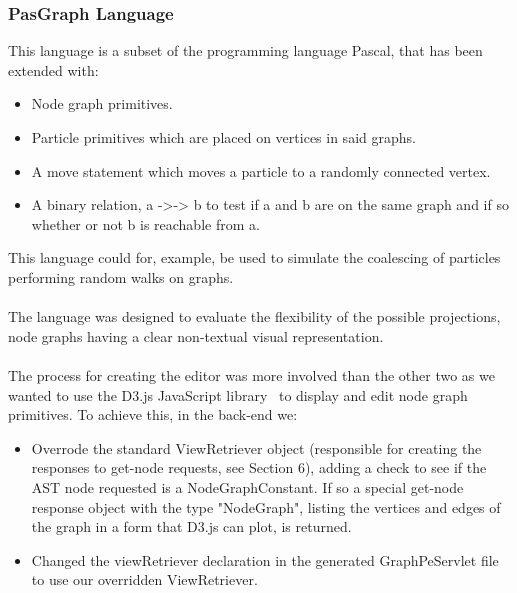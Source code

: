 \documentclass{article}
\begin{document}
{%



\subsubsection{PasGraph Language}\label{pasgraph}
This language is a subset of the programming language Pascal, that has been extended with: 
\begin{itemize}
\item Node graph primitives.
\item Particle primitives which are placed on vertices in said graphs.
\item A move statement which moves a particle to a randomly connected vertex.
\item A binary relation, a ->-> b to test if a and b are on the same graph and if so whether or not b is reachable from a.
\end{itemize}
This language could for, example, be used to simulate the coalescing of particles performing random walks on graphs. 
\\
\\
The language was designed to evaluate the flexibility of the possible projections, node graphs having a clear non-textual visual representation.
\\
\\
The process for creating the editor was more involved than the other two as we wanted to use the D3.js JavaScript library~\cite{d3} to display and edit node graph primitives. To achieve this, in the back-end we:
\begin{itemize}
\item Overrode the standard ViewRetriever object (responsible for creating the responses to get-node requests, see Section 6), adding a check to see if the AST node requested is a NodeGraphConstant. If so a special get-node response object with the type "NodeGraph", listing the vertices and edges of the graph in a form that D3.js can plot, is returned. 
\item Changed the viewRetriever declaration in the  generated GraphPeServlet file to use our overridden ViewRetriever.

\end{itemize}}
\end{document}
